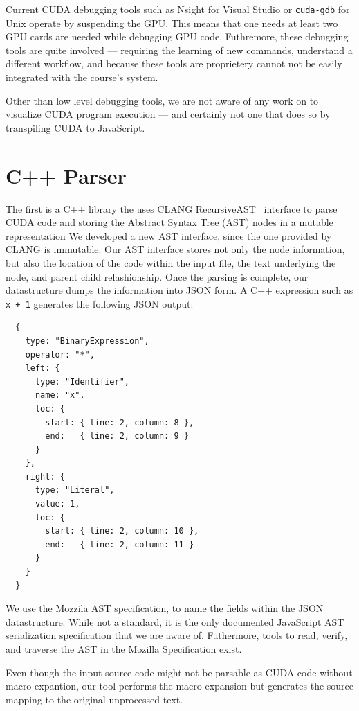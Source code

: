 \documentclass[nocopyrightspace]{sigchi}
\begin{document}
Current CUDA debugging tools such as Nsight for Visual Studio or {\tt cuda-gdb}
for Unix operate by suspending the GPU. This means that one needs at least two
GPU cards are needed while debugging GPU code. Futhremore, these debugging tools
are quite involved --- requiring the learning of new commands, understand a
different workflow, and because these tools are proprietery cannot not be easily
integrated with the course's system.


Other than low level debugging tools, we are not aware of any work on 
to visualize CUDA program execution --- and certainly not one that 
does so by transpiling CUDA to JavaScript.



\section{C++ Parser}

The first is a C++ library the uses CLANG RecursiveAST~\cite{lattner2004llvm} interface to parse CUDA code
and storing the Abstract Syntax Tree (AST) nodes in a mutable representation
We developed a new AST interface, since the one provided by CLANG is immutable.
Our AST interface stores not only the node information, but also the location
of the code within the input file, the text underlying the node, and parent child
relashionship. Once the parsing is complete, our datastructure dumps the information
into JSON form. A C++ expression such as {\tt x + 1} generates the following JSON
output:

\begin{verbatim}
  {
    type: "BinaryExpression",
    operator: "*",
    left: {
      type: "Identifier",
      name: "x",
      loc: {
        start: { line: 2, column: 8 },
        end:   { line: 2, column: 9 }
      }
    },
    right: {
      type: "Literal",
      value: 1,
      loc: {
        start: { line: 2, column: 10 },
        end:   { line: 2, column: 11 }
      }
    }
  }
\end{verbatim}

We use the Mozzila AST specification, to name the fields within the JSON datastructure.
While not a standard, it is the only documented JavaScript AST serialization specification
that we are aware of. Futhermore, tools to read, verify, and traverse the AST in the
Mozilla Specification exist.

Even though the input source code might not be parsable as CUDA code without macro expantion,
our tool performs the macro expansion but generates the source mapping to the original 
unprocessed text.
\end{document}
